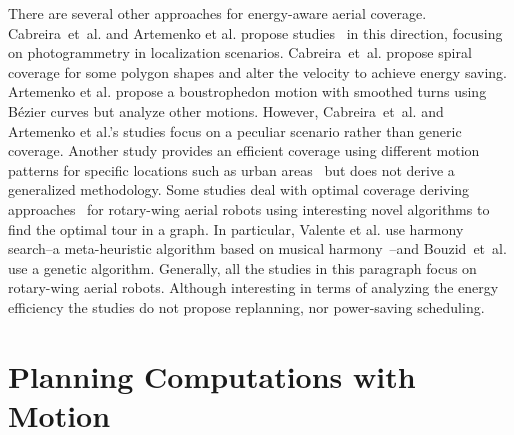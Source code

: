 There are several other approaches for energy-aware aerial coverage. Cabreira~et~al. and Artemenko et al. propose studies~\citep{cabreira2018energy,artemenko2016energy} in this direction, focusing on photogrammetry in localization scenarios. Cabreira~et~al. propose spiral coverage for some polygon shapes and alter the velocity to achieve energy saving. Artemenko et al. propose a boustrophedon motion with smoothed turns using B\'{e}zier curves but analyze other motions. However, Cabreira~et~al. and Artemenko et al.'s studies focus on a peculiar scenario rather than generic coverage. Another study provides an efficient coverage using different motion patterns for specific locations such as urban areas~\citep{dille2013efficient} but does not derive a generalized methodology. Some studies deal with optimal coverage deriving approaches~\citep{valente2013aerial,bouzid2017quadrotor} for rotary-wing aerial robots using interesting novel algorithms to find the optimal tour in a graph. In particular, Valente et al. use harmony search--a meta-heuristic algorithm based on musical harmony~\citep{geem2009music}--and Bouzid~et~al. use a genetic algorithm. Generally, all the studies in this paragraph focus on rotary-wing aerial robots. Although interesting in terms of analyzing the energy efficiency the studies do not propose replanning, nor power-saving scheduling.


\section{Planning Computations with Motion}
\label{sec:soa-comp-motion-pl}

